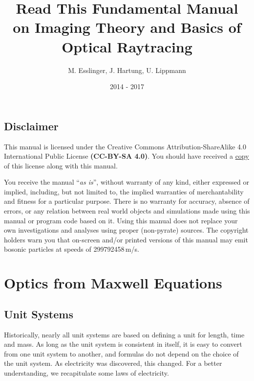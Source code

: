 \documentclass[12pt,a4paper,twoside,openright,BCOR10mm,headsepline,titlepage,abstracton,chapterprefix,final]{scrreprt}
\begin{document}

\titlehead{ }
\subject{Pyrate -- Optical raytracing based on Python}
\title{Read This Fundamental Manual \\ on Imaging Theory and Basics of Optical Raytracing}
\author{M. Esslinger, J. Hartung, U. Lippmann}
\date{2014 - 2017}
\publishers{}
\maketitle

\onehalfspacing

\tableofcontents

\cleardoublepage


\singlespacing

\section{Disclaimer}

This manual is licensed under the
Creative Commons Attribution-ShareAlike 4.0 International Public License
\textbf{(CC-BY-SA 4.0)}.
You should have received a \href{rtfm_license.html}{copy} of this license along with this manual.

You receive the manual ``\emph{as is}'', without warranty of any kind, either expressed or implied, 
including, but not limited to, the implied warranties of merchantability and fitness for a particular purpose.
There is no warranty for accuracy, absence of errors, or any relation between real world objects and simulations made 
using this manual or program code based on it.
Using this manual does not replace your own investigations and analyses using proper (non-pyrate) sources. 
The copyright holders warn you that on-screen and/or printed versions of this manual may emit bosonic particles at speeds of 299792458\,m/s.

\chapter{Optics from Maxwell Equations}
\section{Unit Systems}
Historically, nearly all unit systems are based on defining a unit for length, time and mass.
As long as the unit system is consistent in itself, 
it is easy to convert from one unit system to another, and formulas do not depend on the choice of the unit system.
As electricity was discovered, this changed.
For a better understanding, we recapitulate some laws of electricity.
\end{document}
